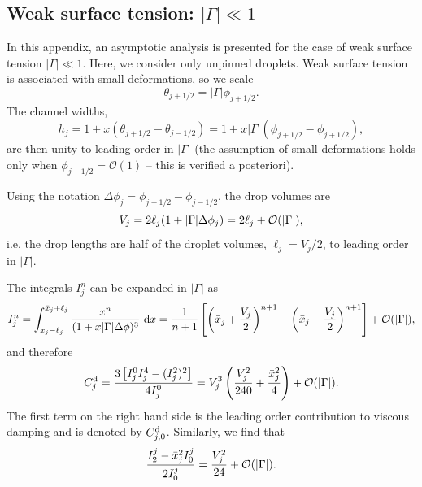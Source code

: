 \begin{subappendices}
\section{Weak surface tension: $|\Gamma | \ll 1$}\label{Appendix:SmallGammaAnalysis}
\newcommand{\smallpar}{|\Gamma|} %
\newcommand{\angl}{\phi}
\newcommand{\dangl}{\Delta \angl}
In this appendix, an asymptotic analysis is presented for the case of weak surface tension $|\Gamma | \ll 1$. Here, we consider only unpinned droplets. Weak surface tension is associated with small deformations, so we scale
\begin{equation}\label{A:E:SmallGamma:ScaledAngles}
\theta_{j+1/2} = \smallpar \angl_{j+1/2}.
\end{equation}
The channel widths,
\begin{equation}\label{A:E:SmallGamma:ChannelWidths}
h_j = 1 +x (\theta_{j+1/2} - \theta_{j-1/2}) = 1 + x\smallpar (\angl_{j+1/2} - \angl_{j+1/2}),
\end{equation}
are then unity to leading order in $\smallpar$ (the assumption of small deformations holds only when $\angl_{j+1/2} = \mathcal{O}(1)$ -- this is verified a posteriori).

Using the notation $\Delta \angl_j = \angl_{j+1/2} - \angl_{j-1/2}$, the drop volumes are
\begin{equation}\label{A:E:SmallGamma:Volumes}
V_j = 2\ell_j(1 + \smallpar \Delta \angl_j) =2\ellj + \mathcal{O}(\smallpar),
\end{equation}
i.e. the drop lengths are half of the droplet volumes, $\ell_j = V_j/2$, to leading order in $\smallpar$.

The integrals $I_j^n$ can be expanded in $\smallpar$ as
\begin{equation*}
I_j^n = \int_{\xbarj - \ellj}^{\xbarj + \ellj} \frac{x^n}{(1 + x\smallpar \dangl)^3} ~\mathrm{d}x= \frac{1}{n+1}\left[\left(\xbar_j + \frac{V_j}{2}\right)^{n+1} - \left(\xbar_j -\frac{V_j}{2
} \right)^{n+1}\right] + \mathcal{O}(\smallpar),
\end{equation*}
and therefore
\begin{equation}\label{A:E:SmallGamma:IntegralExpansionsI}
\viscdamp_j = \frac{3\left[I^0_j I^4_j - (I^2_j)^2\right]}{4I^0_j} = V_j^3\left(\frac{V_j^2}{240} + \frac{\xbar_j^2}{4}\right) +\mathcal{O}(\smallpar).
\end{equation}
The first term on the right hand side is the leading order contribution to viscous damping and is denoted by $C^{\text{d}}_{j,0}$. Similarly, we find that
\begin{equation}\label{A:E:SmallGamma:IntegralExpansionsII}
\frac{I_2^j - \xbar_j^2 I_0^j}{2I_0^j} = \frac{V_j^2}{24} + \mathcal{O}(\smallpar).
\end{equation}


\end{subappendices}
